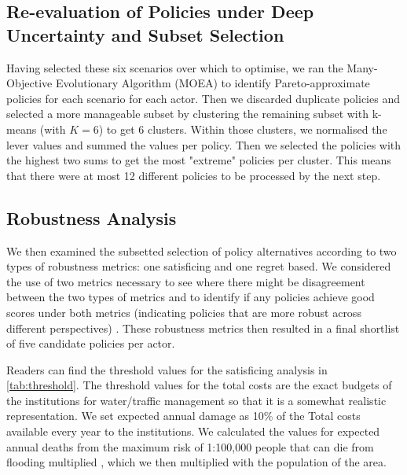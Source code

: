 \subsection{Re-evaluation of Policies under Deep Uncertainty and Subset Selection}
Having selected these six scenarios over which to optimise, we ran the Many-Objective Evolutionary Algorithm (MOEA) to identify Pareto-approximate policies for each scenario for each actor. Then we discarded duplicate policies and selected a more manageable subset by clustering the remaining subset with k-means (with $K=6$) to get 6 clusters. Within those clusters, we normalised the lever values and summed the values per policy. Then we selected the policies with the highest two sums to get the most "extreme" policies per cluster. This means that there were at most 12 different policies to be processed by the next step.

\subsection{Robustness Analysis}
We then examined the subsetted selection of policy alternatives according to two types of robustness metrics: one satisficing and one regret based. We considered the use of two metrics necessary to see where there might be disagreement between the two types of metrics and to identify if any policies achieve good scores under both metrics (indicating policies that are more robust across different perspectives) \parencite{mcphail_robustness_2018}. These robustness metrics then resulted in a final shortlist of five candidate policies per actor.

Readers can find the threshold values for the satisficing analysis in \autoref{tab:threshold}. The threshold values for the total costs are the exact budgets of the institutions for water/traffic management so that it is a somewhat realistic representation. We set expected annual damage as 10\% of the Total costs available every year to the institutions. We calculated the values for expected annual deaths from the maximum risk of 1:100,000 people that can die from flooding multiplied \parencite{slootjes_achtergronden_2016}, which we then multiplied with the population of the area.


